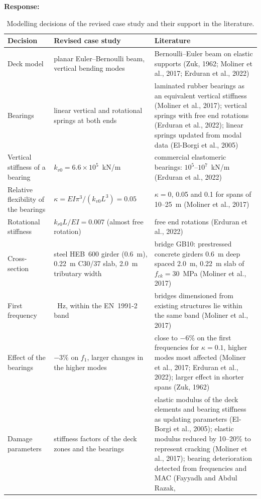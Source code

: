\documentclass[11pt]{article}
\newenvironment{response}{\par\smallskip\noindent\color{resp}\textbf{Response:}\ }{\par}
\begin{document}
\begin{response}
\begin{table}[H]
\centering\small
\caption{Modelling decisions of the revised case study and their support in the literature.}
\label{tab:lit}
\footnotesize
\begin{tabular}{>{\raggedright\arraybackslash}p{3.1cm}>{\raggedright\arraybackslash}p{4.3cm}%
>{\raggedright\arraybackslash}p{7.4cm}}
\toprule
Decision & Revised case study & Literature \\
\midrule
Deck model & planar Euler--Bernoulli beam, vertical bending modes & Bernoulli--Euler beam on elastic supports (Zuk,
1962; Moliner et al., 2017; Erduran et al., 2022) \\
Bearings & linear vertical and rotational springs at both ends & laminated rubber bearings as an equivalent vertical
stiffness (Moliner et al., 2017); vertical springs with free end rotations (Erduran et al., 2022); linear springs updated
from modal data (El-Borgi et al., 2005) \\
Vertical stiffness of a bearing & $k_{v0}=6.6\times10^{5}$~kN/m & commercial elastomeric bearings:
$10^{5}$--$10^{7}$~kN/m (Erduran et al., 2022) \\
Relative flexibility of the bearings & $\kappa=EI\pi^3/(k_{v0}L^3)=0.05$ & $\kappa=0$, 0.05 and 0.1 for spans of
10--25~m (Moliner et al., 2017) \\
Rotational stiffness & $k_{r0}L/EI=0.007$ (almost free rotation) & free end rotations (Erduran et al., 2022) \\
Cross-section & steel HEB~600 girder (0.6~m), 0.22~m C30/37 slab, 2.0~m tributary width & bridge GB10: prestressed
concrete girders 0.6~m deep spaced 2.0~m, 0.22~m slab of $f_{ck}=30$~MPa (Moliner et al., 2017) \\
First frequency & 11.9~Hz, within the EN~1991-2 band & bridges dimensioned from existing structures lie within the
same band (Moliner et al., 2017) \\
Effect of the bearings & $-3\%$ on $f_1$, larger changes in the higher modes & close to $-6\%$ on the first
frequencies for $\kappa=0.1$, higher modes most affected (Moliner et al., 2017; Erduran et al., 2022); larger effect in
shorter spans (Zuk, 1962) \\
Damage parameters & stiffness factors of the deck zones and the bearings & elastic modulus of the deck elements and
bearing stiffness as updating parameters (El-Borgi et al., 2005); elastic modulus reduced by 10--20\% to represent
cracking (Moliner et al., 2017); bearing deterioration detected from frequencies and MAC (Fayyadh and Abdul Razak,

\end{tabular}
\end{table}
\end{response}
\end{document}
